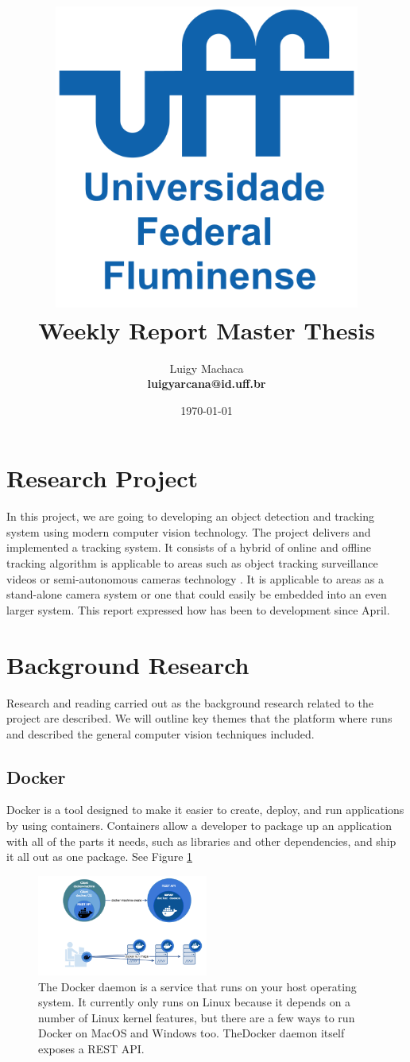 \documentclass[a4paper]{article}
\title{
    \vspace*{1in}
    \includegraphics[width=3.95in]{figures/uff-logo.png} \\
    \vspace*{1.2in}
    \textbf{\huge Weekly Report Master Thesis}
    \vspace{0.2in}\\
    \vspace{0.2in}
}
\author{Luigy Machaca \\
    \textbf{luigyarcana@id.uff.br} \\
}
\date{\today}
\begin{document}
\maketitle
\setcounter{page}{0}
\thispagestyle{empty}
\newpage


\section{Research Project}
In this project, we are going to developing an object detection and tracking system using modern computer vision technology. The project delivers and implemented a tracking system. It consists of a hybrid of online and offline tracking algorithm is applicable to areas such as object tracking surveillance videos or semi-autonomous cameras technology \cite{re3} . It is applicable to areas as a stand-alone camera system or one that could easily be embedded into an even larger system. This report expressed how has been to development since April.

\section{ Background Research  }

Research and reading carried out as the background research related to the project are described. We will outline key themes that the platform where runs and described the general computer vision techniques included.

\subsection{Docker}
Docker is a tool designed to make it easier to create, deploy, and run applications by using containers. Containers allow a developer to package up an application with all of the parts it needs, such as libraries and other dependencies, and ship it all out as one package. See Figure \ref{fig:docker} 


\begin{figure}[hb]
    \centering
    \includegraphics[width=0.5\textwidth]{figures/docker.png}
    \caption{The Docker daemon is a service that runs on your host operating system. It currently only runs on Linux because it depends on a number of Linux kernel features, but there are a few ways to run Docker on MacOS and Windows too. TheDocker daemon itself exposes a REST API.}
    \label{fig:docker}
\end{figure}
\end{document}

